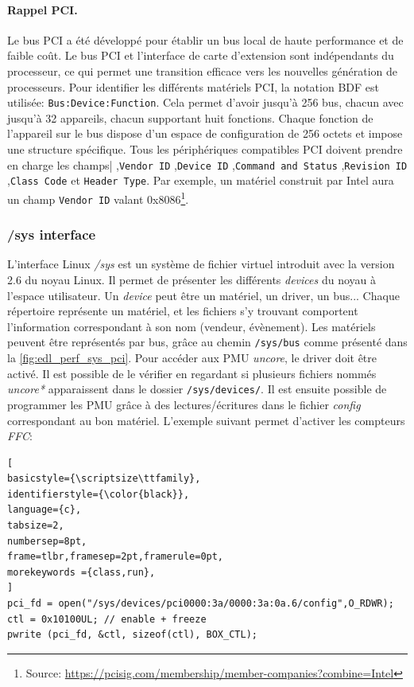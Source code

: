         \paragraph{Rappel PCI.} 
        
            Le bus PCI a été développé pour établir un bus local de haute performance et de faible coût. Le bus PCI et l'interface de carte d'extension sont indépendants du processeur, ce qui permet une transition efficace vers les nouvelles génération de processeurs. Pour identifier les différents matériels PCI, la notation BDF est utilisée: \verb|Bus:Device:Function|. Cela permet d'avoir jusqu'à 256 bus, chacun avec jusqu'à 32 appareils, chacun supportant huit fonctions. Chaque fonction de l'appareil sur le bus dispose d'un espace de configuration de 256 octets et impose une structure spécifique. Tous les périphériques compatibles PCI doivent prendre en charge les champs| ,\verb|Vendor ID| ,\verb|Device ID| ,\verb|Command and Status| ,\verb|Revision ID| ,\verb|Class Code| et \verb|Header Type|. Par exemple, un matériel construit par Intel aura un champ \verb|Vendor ID| valant 0x8086\footnote{Source: \url{https://pcisig.com/membership/member-companies?combine=Intel}}.
    
    

    \subsubsection{/sys interface}\label{annexe:hc_sys}
        L'interface Linux \textit{/sys} est un système de fichier virtuel introduit avec la version 2.6 du noyau Linux. Il permet de présenter les différents \textit{devices} du noyau à l'espace utilisateur. Un \textit{device} peut être un matériel, un driver, un bus... Chaque répertoire représente un matériel, et les fichiers s'y trouvant comportent l'information correspondant à son nom (vendeur, évènement). Les matériels peuvent être représentés par bus, grâce au chemin \verb|/sys/bus| comme présenté dans la \autoref{fig:edl_perf_sys_pci}. Pour accéder aux PMU \textit{uncore}, le driver doit être activé. Il est possible de le vérifier en regardant si plusieurs fichiers nommés \textit{uncore*} apparaissent dans le dossier \verb|/sys/devices/|. Il est ensuite possible de programmer les PMU grâce à des lectures/écritures dans le fichier \textit{config} correspondant au bon matériel. L'exemple suivant permet d'activer les compteurs \textit{FFC}:
   
    
\begin{lstlisting}[
basicstyle={\scriptsize\ttfamily},
identifierstyle={\color{black}},
language={c},
tabsize=2,
numbersep=8pt,
frame=tlbr,framesep=2pt,framerule=0pt,
morekeywords ={class,run},
]
pci_fd = open("/sys/devices/pci0000:3a/0000:3a:0a.6/config",O_RDWR);
ctl = 0x10100UL; // enable + freeze
pwrite (pci_fd, &ctl, sizeof(ctl), BOX_CTL);
\end{lstlisting}

